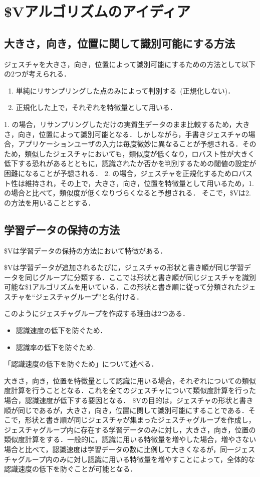 \section{\$Vアルゴリズムのアイディア}

\subsection{大きさ，向き，位置に関して識別可能にする方法}
ジェスチャを大きさ，向き，位置によって識別可能にするための方法として以下の2つが考えられる．
\begin{enumerate}
\item 単純にリサンプリングした点のみによって判別する~(正規化しない)．
\item 正規化した上で，それぞれを特徴量として用いる．
\end{enumerate}
1. の場合，リサンプリングしただけの実質生データのまま比較するため，大きさ，向き，位置によって識別可能となる．しかしながら，手書きジェスチャの場合，アプリケーションユーザの入力は毎度微妙に異なることが予想される．そのため，類似したジェスチャにおいても，類似度が低くなり，ロバスト性が大きく低下する恐れがあるとともに，認識されたか否かを判別するための閾値の設定が困難になることが予想される．
2. の場合，ジェスチャを正規化するためロバスト性は維持され，その上で，大きさ，向き，位置を特徴量として用いるため，1. の場合と比べて，類似度が低くなりづらくなると予想される．
そこで，\$Vは2. の方法を用いることとする．

\subsection{学習データの保持の方法}
\$Vは学習データの保持の方法において特徴がある．

\$Vは学習データが追加されるたびに，ジェスチャの形状と書き順が同じ学習データを同じグループに分類する．ここでは形状と書き順が同じジェスチャを識別可能な\$1アルゴリズムを用いている．この形状と書き順に従って分類されたジェスチャを``ジェスチャグループ''と名付ける．

このようにジェスチャグループを作成する理由は2つある．
\begin{itemize}
\item 認識速度の低下を防ぐため．
\item 認識率の低下を防ぐため.
\end{itemize}

「認識速度の低下を防ぐため」について述べる．

大きさ，向き，位置を特徴量として認識に用いる場合，それぞれについての類似度計算を行うこととなる．これを全てのジェスチャについて類似度計算を行った場合，認識速度が低下する要因となる．
\$Vの目的は，ジェスチャの形状と書き順が同じであるが，大きさ，向き，位置に関して識別可能にすることである．そこで，形状と書き順が同じジェスチャが集まったジェスチャグループを作成し，ジェスチャグループ内に存在する学習データのみに対し，大きさ，向き，位置の類似度計算をする．一般的に，認識に用いる特徴量を増やした場合，増やさない場合と比べて，認識速度は学習データの数に比例して大きくなるが，同一ジェスチャグループ内のみに対し認識に用いる特徴量を増やすことによって，全体的な認識速度の低下を防ぐことが可能となる．

